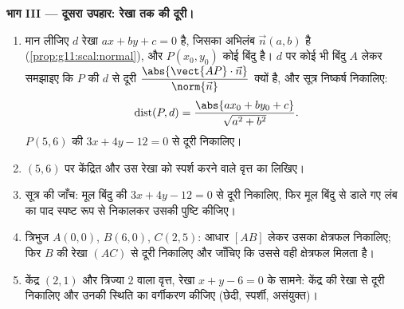 \begin{problem}
\medskip
\noindent\textbf{भाग III --- दूसरा उपहार: रेखा तक की दूरी।}
\begin{enumerate}[resume]
  \item मान लीजिए $d$ रेखा $ax + by + c = 0$ है, जिसका अभिलंब  $\vec n(a, b)$ है (\cref{prop:g11:scal:normal}),
        और $P(x_0, y_0)$ कोई बिंदु है। $d$ पर कोई भी बिंदु $A$ लेकर समझाइए कि
        $P$ की $d$ से दूरी $\dfrac{\abs{\vect{AP} \cdot \vec n}}{\norm{\vec n}}$ क्यों है, और सूत्र निष्कर्ष निकालिए:
        \[
        \operatorname{dist}(P, d)
        = \frac{\abs{a x_0 + b y_0 + c}}{\sqrt{a^2 + b^2}} .
        \]
        $P(5, 6)$ की $3x + 4y - 12 = 0$ से दूरी निकालिए।
  \item $(5, 6)$ पर केंद्रित और उस रेखा को स्पर्श करने वाले वृत्त का 
        लिखिए।
  \item सूत्र की जाँच: मूल बिंदु की $3x + 4y - 12 = 0$ से दूरी निकालिए, फिर मूल बिंदु से
        डाले गए लंब का पाद स्पष्ट रूप से निकालकर उसकी पुष्टि कीजिए।
  \item त्रिभुज $A(0,0)$, $B(6,0)$, $C(2,5)$: आधार $[AB]$ लेकर उसका क्षेत्रफल
        निकालिए; फिर $B$ की रेखा $(AC)$ से दूरी निकालिए और जाँचिए कि उससे
        वही क्षेत्रफल मिलता है।
  \item केंद्र $(2, 1)$ और त्रिज्या $2$ वाला वृत्त, रेखा $x + y - 6 = 0$ के सामने:
        केंद्र की रेखा से दूरी निकालिए और उनकी स्थिति का वर्गीकरण कीजिए
        (छेदी, स्पर्शी, असंयुक्त)।
\end{enumerate}


\end{problem}
